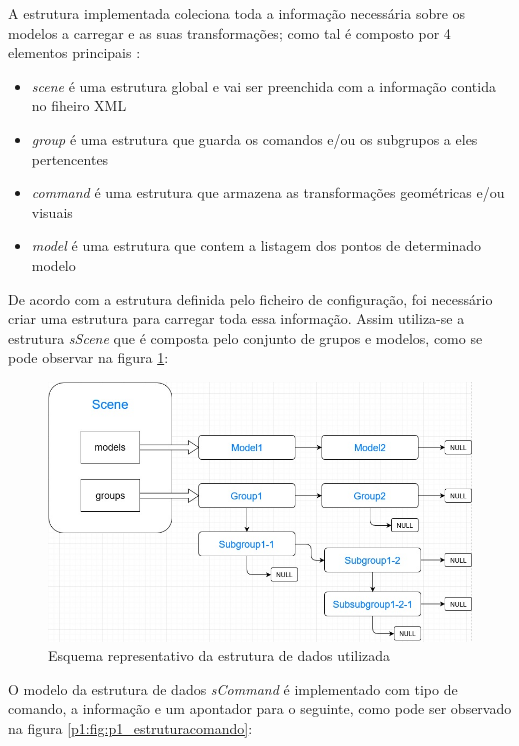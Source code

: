 A estrutura implementada coleciona toda a informação necessária sobre os modelos a carregar e as suas transformações; como tal é composto por 4 elementos principais :

\begin{itemize}
	\item \textit{scene} é uma estrutura global e vai ser preenchida com a informação contida no fiheiro XML
	\item \textit{group} é uma estrutura que guarda os comandos e/ou os subgrupos a eles pertencentes 
	\item \textit{command} é uma estrutura que armazena as transformações geométricas e/ou visuais
	\item \textit{model} é uma estrutura que contem a listagem dos pontos de determinado modelo
\end{itemize}

De acordo com a estrutura definida pelo ficheiro de configuração, foi necessário criar uma estrutura para carregar toda essa informação.  Assim utiliza-se a estrutura \textit{sScene }que é composta pelo conjunto de grupos e modelos, como se pode observar na figura \ref{p1:fig:p1_estrutura}:

\begin{figure}[htpb]
	\centering
	\includegraphics[scale=0.5]{imagens/structureComplete.jpg}
	\caption{Esquema representativo da estrutura de dados utilizada}
	\label{p1:fig:p1_estrutura}
\end{figure}


O modelo da estrutura de dados  \textit{sCommand} é implementado com tipo de comando, a informação e um apontador para o seguinte, como pode ser observado na figura \ref{p1:fig:p1_estruturacomando}:

